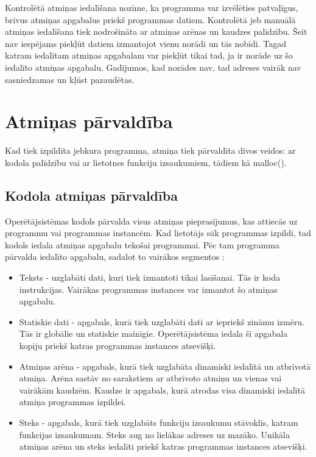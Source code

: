 Kontrolētā atmiņas iedalīšana nozīme, ka programma var izvēlēties patvaļīgus, brīvus atmiņas apgabalus priekš programmas datiem. 
Kontrolētā jeb manuālā atmiņas iedalīšana tiek nodrošināta ar atmiņas arēnas un kaudzes palīdzību. 
Šeit nav iespējams piekļūt datiem izmantojot vienu norādi un tās nobīdi. 
Tagad katram iedalītam atmiņas apgabalam var piekļūt tikai tad, ja ir norāde uz šo iedalīto atmiņas apgabalu. 
Gadījumos, kad norādes nav, tad adreses vairāk nav sasniedzamas un kļūst pazaudētas.


\section{Atmiņas pārvaldība}
Kad tiek izpildīta jebkura programma, atmiņa tiek pārvaldīta divos veidos: ar kodola palīdzību vai ar lietotnes funkciju izsaukumiem, tādiem kā malloc().

\subsection{Kodola atmiņas pārvaldība}
Operētājsistēmas kodols pārvalda  visus atmiņas pieprasījumus, kas attiecās uz programmu vai programmas instancēm.
Kad lietotājs sāk programmas izpildi, tad kodols iedala atmiņas apgabalu tekošai programmai.
Pēc tam programma pārvalda iedalīto apgabalu, sadalot to vairākos segmentos  \cite {atparv}: 
\begin{itemize}
	\item   Teksts - uzglabāti dati, kuri tiek izmantoti tikai lasīšanai. Tās ir koda instrukcijas. 
    Vairākas programmas instances var izmantot šo atmiņas apgabalu.
    \item Statiskie dati - apgabals, kurā tiek uzglabāti dati ar iepriekš zināmu izmēru. Tās ir globālie un statiskie mainīgie.
    Operētājsistēma iedala šī apgabala kopiju priekš katras programmas instances atsevišķi.
    \item Atmiņas arēna - apgabals, kurā tiek uzglabāta dinamiski iedalītā un atbrīvotā atmiņa. 
    Arēna sastāv no sarakstiem ar atbrīvoto atmiņu un vienas vai vairākām kaudzēm.
    Kaudze ir apgabals, kurā atrodas visa dinamiski iedalītā atmiņa programmas izpildei.
    \item Steks - apgabals, kurā tiek uzglabāts funkciju izsaukumu stāvoklis, katram funkcijas izsaukumam. Steks aug no lielākas adreses uz mazāko. 
    Unikāla atmiņas arēna un steks iedalīti priekš katras programmas instances atsevišķi.
\end{itemize} 

